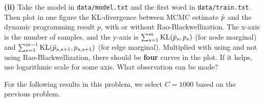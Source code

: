 \documentclass[11pt]{report}
\begin{document}
\begin{itemize}
	\textbf{(ii)} Take the model in \verb#data/model.txt# and the first word in \verb#data/train.txt#. Then plot in one figure the KL-divergence between MCMC estimate $\tilde{p}$ and the dynamic programming result $p$, with or without Rao-Blackwellization.
	The x-axis is the number of samples,
	and the y-axis is 
	$\sum_{s=1}^m \text{KL}(\tilde{p}_s, p_s)$ (for node marginal) and 
	$\sum_{s=1}^{m-1} \text{KL}(\tilde{p}_{s,s+1}, p_{s,s+1})$ (for edge marginal).
	Multiplied with using and not using Rao-Blackwellization,
	there should be \textbf{four} curves in the plot.
	If it helps, use logarithmic scale for some axis.
	What observation can be made?
\end{itemize}

For the following results in this problem, we select $C = 1000$ based on the previous problem.
\end{document}
